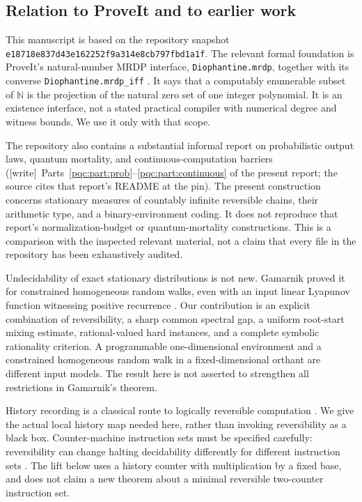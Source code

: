 \documentclass[11pt,letterpaper]{article}
\numberwithin{equation}{section}
\theoremstyle{definition}
\theoremstyle{remark}
\newcommand{\N}{\mathbb N}
\newcommand{\code}[1]{\nolinkurl{#1}}
\newcommand{\wtag}{\textup{[write]}}
\newcommand{\pin}{{\small\texttt{e18718e837d43e162252f9a314e8cb797fbd1a1f}}}
\begin{document}
\subsection{Relation to ProveIt and to earlier work}
This manuscript is based on the repository snapshot \pin. The relevant
formal foundation is ProveIt's natural-number MRDP interface,
\code{Diophantine.mrdp}, together with its converse
\code{Diophantine.mrdp_iff} \cite{b62s17-proveit-mrdp}. It says that a
computably enumerable subset of $\N$ is the projection of the natural
zero set of one integer polynomial. It is an existence interface, not a
stated practical compiler with numerical degree and witness bounds.
We use it only with that scope.

The repository also contains a substantial informal report on
probabilistic output laws, quantum mortality, and continuous-computation
barriers (\wtag\ Parts~\ref{pqc:part:prob}--\ref{pqc:part:continuous} of the present report; the source cites that report's README at the pin). The present construction concerns stationary
measures of countably infinite reversible chains, their arithmetic type,
and a binary-environment coding. It does not reproduce that report's
normalization-budget or quantum-mortality constructions. This is a
comparison with the inspected relevant material, not a claim that every
file in the repository has been exhaustively audited.

Undecidability of exact stationary distributions is not new. Gamarnik
proved it for constrained homogeneous random walks, even with an input
linear Lyapunov function witnessing positive recurrence
\cite{b62s17-gamarnik}. Our contribution is an explicit combination of
reversibility, a sharp common spectral gap, a uniform root-start mixing
estimate, rational-valued hard instances, and a complete symbolic
rationality criterion. A programmable one-dimensional environment and a
constrained homogeneous random walk in a fixed-dimensional orthant are
different input models. The result here is not asserted to strengthen
all restrictions in Gamarnik's theorem.

History recording is a classical route to logically reversible
computation \cite{b62s17-bennett}. We give the actual local history map needed
here, rather than invoking reversibility as a black box. Counter-machine
instruction sets must be specified carefully: reversibility can change
halting decidability differently for different instruction sets
\cite{b62s17-morita,b62s17-dudenhefner}. The lift below uses a history counter with
multiplication by a fixed base, and does not claim a new theorem about a
minimal reversible two-counter instruction set.
\end{document}
